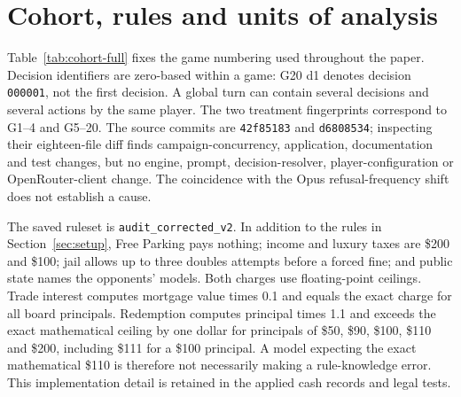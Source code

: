 \section{Cohort, rules and units of analysis}
\label{app:cohort}

Table~\ref{tab:cohort-full} fixes the game numbering used throughout the paper. Decision identifiers are zero-based within a game: G20 d1 denotes decision \texttt{000001}, not the first decision. A global turn can contain several decisions and several actions by the same player. The two treatment fingerprints correspond to G1--4 and G5--20. The source commits are \texttt{42f85183} and \texttt{d6808534}; inspecting their eighteen-file diff finds campaign-concurrency, application, documentation and test changes, but no engine, prompt, decision-resolver, player-configuration or OpenRouter-client change. The coincidence with the Opus refusal-frequency shift does not establish a cause.



The saved ruleset is \texttt{audit\_corrected\_v2}. In addition to the rules in Section~\ref{sec:setup}, Free Parking pays nothing; income and luxury taxes are \$200 and \$100; jail allows up to three doubles attempts before a forced fine; and public state names the opponents' models. Both charges use floating-point ceilings. Trade interest computes mortgage value times 0.1 and equals the exact charge for all board principals. Redemption computes principal times 1.1 and exceeds the exact mathematical ceiling by one dollar for principals of \$50, \$90, \$100, \$110 and \$200, including \$111 for a \$100 principal. A model expecting the exact mathematical \$110 is therefore not necessarily making a rule-knowledge error. This implementation detail is retained in the applied cash records and legal tests.

